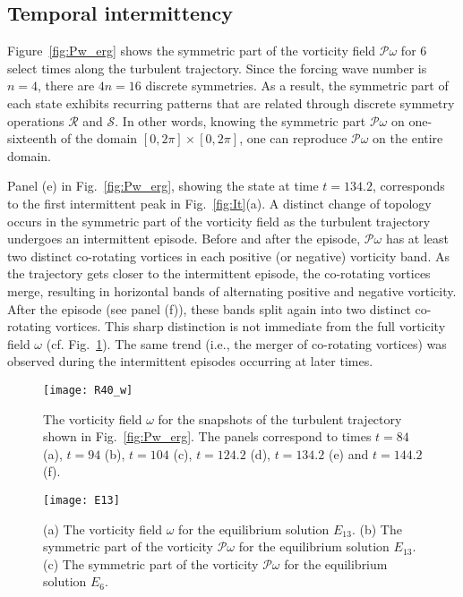 \documentclass{jfm}
\begin{document}
\subsection{Temporal intermittency}
Figure~\ref{fig:Pw_erg} shows the symmetric part of the vorticity field $\mathcal P\omega$
for 6 select times along the turbulent trajectory. Since the forcing wave number is
$n=4$, there are $4n=16$ discrete symmetries. As a result, the symmetric part of each state
exhibits recurring patterns that are related through discrete symmetry operations $\mathcal R$
and $\mathcal S$. In other words, knowing the symmetric part $\mathcal P\omega$ on one-sixteenth of
the domain $[0,2\pi]\times[0,2\pi]$, one can reproduce $\mathcal P\omega$ on the entire domain.

Panel (e) in Fig.~\ref{fig:Pw_erg}, showing the state at time $t=134.2$,
corresponds to the first intermittent peak in Fig.~\ref{fig:It}(a). A
distinct change of topology occurs in the symmetric part of
the vorticity field as the turbulent trajectory undergoes an intermittent episode.
Before and after the episode, $\mathcal P\omega$ has at least two
distinct co-rotating vortices in each positive (or negative) vorticity band. As the trajectory
gets closer to the intermittent episode, the co-rotating vortices merge, resulting
in horizontal bands of alternating positive and negative vorticity. After the episode
(see panel (f)), these bands split again into two distinct co-rotating vortices.
This sharp distinction is not immediate from the full vorticity field $\omega$
(cf. Fig.~\ref{fig:w_erg}).
The same trend (i.e., the merger of co-rotating vortices) was observed during
the intermittent episodes occurring at later times.
\begin{figure}
\centering
\texttt{[image: R40\_w]}
\caption{The vorticity field $\omega$ for the snapshots of the turbulent trajectory 
shown in Fig.~\ref{fig:Pw_erg}. The panels correspond to times
$t=84$ (a),
$t=94$ (b),
$t=104$ (c),
$t=124.2$ (d),
$t=134.2$ (e) and
$t=144.2$ (f).
}
\label{fig:w_erg}
\end{figure}

\begin{figure}
\centering
\texttt{[image: E13]}
\caption{
(a) The vorticity field $\omega$ for the equilibrium solution $E_{13}$.
(b) The symmetric part of the vorticity $\mathcal P\omega$ for the equilibrium solution $E_{13}$.
(c) The symmetric part of the vorticity $\mathcal P\omega$ for the equilibrium solution $E_{6}$.
}
\label{fig:E13}
\end{figure}
\end{document}
